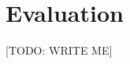 \documentclass{article} %
\begin{document}




\section{Evaluation}
\label{sec:evaluation}

[TODO: WRITE ME]

\end{document}
